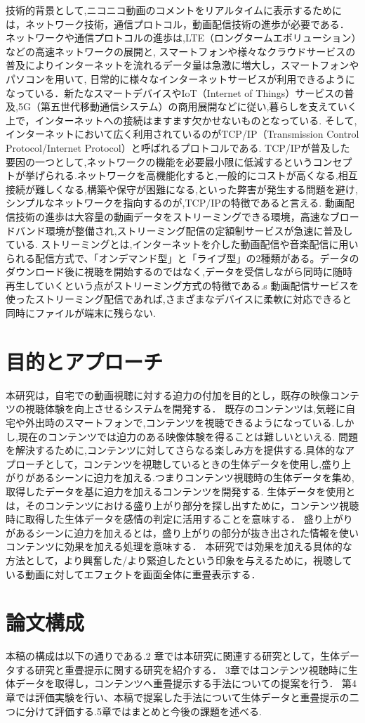 技術的背景として,ニコニコ動画のコメントをリアルタイムに表示するためには，ネットワーク技術，通信プロトコル，動画配信技術の進歩が必要である．
ネットワークや通信プロトコルの進歩は,LTE（ロングタームエボリューション）などの高速ネットワークの展開と, スマートフォンや様々なクラウドサービスの普及によりインターネットを流れるデータ量は急激に増大し，スマートフォンやパソコンを用いて,
日常的に様々なインターネットサービスが利用できるようになっている．新たなスマートデバイスやIoT（Internet of Things）サービスの普及,5G（第五世代移動通信システム）の商用展開などに従い,暮らしを支えていく上で，インターネットへの接続はますます欠かせないものとなっている.
そして,インターネットにおいて広く利用されているのがTCP/IP（Transmission Control Protocol/Internet Protocol）と呼ばれるプロトコルである.
TCP/IPが普及した要因の一つとして,ネットワークの機能を必要最小限に低減するというコンセプトが挙げられる.ネットワークを高機能化すると,一般的にコストが高くなる,相互接続が難しくなる,構築や保守が困難になる,といった弊害が発生する問題を避け,シンプルなネットワークを指向するのが,TCP/IPの特徴であると言える.
動画配信技術の進歩は大容量の動画データをストリーミングできる環境，高速なブロードバンド環境が整備され,ストリーミング配信の定額制サービスが急速に普及している.
ストリーミングとは,インターネットを介した動画配信や音楽配信に用いられる配信方式で、「オンデマンド型」と「ライブ型」の2種類がある。データのダウンロード後に視聴を開始するのではなく,データを受信しながら同時に随時再生していくという点がストリーミング方式の特徴である.s
動画配信サービスを使ったストリーミング配信であれば,さまざまなデバイスに柔軟に対応できると同時にファイルが端末に残らない.

\section{目的とアプローチ}
本研究は，自宅での動画視聴に対する迫力の付加を目的とし，既存の映像コンテツの視聴体験を向上させるシステムを開発する．
既存のコンテンツは,気軽に自宅や外出時のスマートフォンで,コンテンツを視聴できるようになっている.しかし,現在のコンテンツでは迫力のある映像体験を得ることは難しいといえる.
問題を解決するために,コンテンツに対してさらなる楽しみ方を提供する.具体的なアプローチとして，コンテンツを視聴しているときの生体データを使用し,盛り上がりがあるシーンに迫力を加える.つまりコンテンツ視聴時の生体データを集め,取得したデータを基に迫力を加えるコンテンツを開発する.
生体データを使用とは，そのコンテンツにおける盛り上がり部分を探し出すために，コンテンツ視聴時に取得した生体データを感情の判定に活用することを意味する．
盛り上がりがあるシーンに迫力を加えるとは，盛り上がりの部分が抜き出された情報を使いコンテンツに効果を加える処理を意味する．
本研究では効果を加える具体的な方法として，より興奮した/より緊迫したという印象を与えるために，視聴している動画に対してエフェクトを画面全体に重畳表示する．

\section{論文構成}
本稿の構成は以下の通りである.2 章では本研究に関連する研究として，生体データする研究と重畳提示に関する研究を紹介する．
3章ではコンテンツ視聴時に生体データを取得し，コンテンツへ重畳提示する手法についての提案を行う．
第4章では評価実験を行い、本稿で提案した手法について生体データと重畳提示の二つに分けて評価する.5章ではまとめと今後の課題を述べる.

